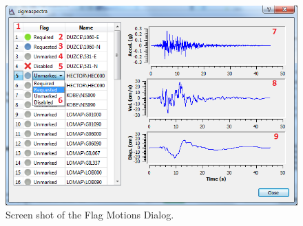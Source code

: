\documentclass[11pt]{article}
\begin{document}
\begin{figure}[h]
  \begin{center}
	\includegraphics[scale=0.7]{screenshots/flagMotions}
  \end{center}
  \caption{Screen shot of the Flag Motions Dialog.}
  \label{fig:interface:flagMotions}
\end{figure}
\end{document}
